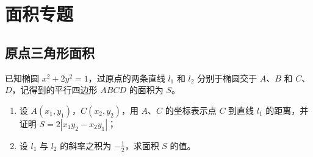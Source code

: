 ﻿\chapter{面积专题}
\section{原点三角形面积}

\begin{example}
已知椭圆 \(x^2 + 2y^2 = 1\)，过原点的两条直线 \(l_1\) 和 \(l_2\) 分别于椭圆交于 \(A\)、\(B\) 和 \(C\)、\(D\)，记得到的平行四边形 \(ABCD\) 的面积为 \(S\)。
\begin{enumerate}
    \item 设 \(A(x_1,y_1)\)，\(C(x_2,y_2)\)，用 \(A\)、\(C\) 的坐标表示点 \(C\) 到直线 \(l_1\) 的距离，并证明 \(S = 2|x_1y_2 - x_2y_1|\)；
    \item 设 \(l_1\) 与 \(l_2\) 的斜率之积为 \(-\frac{1}{2}\)，求面积 \(S\) 的值。
\end{enumerate}
\end{example}
